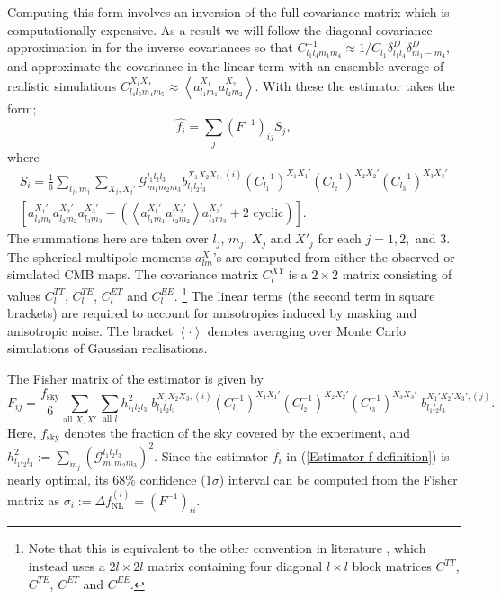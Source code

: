 Computing this form involves an inversion of the full covariance matrix which is computationally expensive. As a result we will follow the diagonal covariance approximation in \cite{Yadav2007} for the inverse covariances so that {$C_{l_1 l_4 m_1 m_4}^{-1} \approx 1/C_{l_1}  \delta^D_{l_1 l_4} \delta^D_{m_1 -m_4}$}, and approximate the covariance in the linear term with an ensemble average of realistic simulations  {$C_{l_4 l_5 m_4 m_5}^{X_1 X_2} \approx \left< a_{l_1 m_1}^{X_1} a_{l_2 m_2}^{X_2} \right>$}.  With these the estimator takes the form;
\begin{equation}
	\hat{f_i} = \sum_j (F^{-1})_{ij} S_j,
	\label{Estimator f definition}
\end{equation}
where
\begin{eqnarray}
	S_i =  \frac{1}{6} \sum_{l_j, m_j} \sum_{X_j, X_j'} \mathcal{G}_{m_1 m_2 m_3}^{l_1 l_2 l_3} b_{l_1 l_2 l_3} ^{X_1 X_2 X_3, (i)} (C_{l_1}^{-1})^{X_1 X_1'} (C_{l_2}^{-1})^{X_2 X_2'} (C_{l_3}^{-1})^{X_3 X_3'} \nonumber \\  \left[ a_{l_1 m_1}^{X_1'} a_{l_2 m_2}^{X_2'} a_{l_3 m_3}^{X_3'} -  \left( \left< a_{l_1 m_1}^{X_1'} a_{l_2 m_2}^{X_2'} \right> a_{l_3 m_3}^{X_3'} + \text{2 cyclic} \right)   \right].
	\label{Estimator S definition}
\end{eqnarray}
The summations here are taken over $l_j$, $m_j$, $X_j$ and $X'_j$ for each $j=1,2,$ and $3$. The spherical multipole moments $a_{lm}^{X}$'s are computed from either the observed or simulated CMB maps. The covariance matrix $C_l^{XY}$ is a $2\times2$ matrix consisting of values $C_l^{TT}$, $C_l^{TE}$, $C_l^{ET}$ and $C_l^{EE}$. \footnote{Note that this is equivalent to the other convention in literature \cite{Fergusson2014}, which instead uses a $2l\times2l$ matrix containing four diagonal $l\times l$ block matrices $C^{TT}$, $C^{TE}$, $C^{ET}$ and $C^{EE}$.} The linear terms (the second term in square brackets) are required to account for anisotropies induced by masking and anisotropic noise. The bracket $\left< \cdot \right>$ denotes averaging over Monte Carlo simulations of Gaussian realisations.

The Fisher matrix of the estimator is given by
\begin{equation}
	F_{ij}= \frac{f_\text{sky}}{6} \sum_{\text{all }X, X'} \sum_{\text{all }l} h_{l_1 l_2 l_3}^2 \; b_{l_1 l_2 l_3}^{X_1 X_2 X_3, (i)} (C_{l_1}^{-1})^{X_1 X_1'} (C_{l_2}^{-1})^{X_2 X_2'} (C_{l_3}^{-1})^{X_3 X_3'} \; b_{l_1 l_2 l_3}^{X_1' X_2' X_3', (j)}.
	\label{Estimator F definition}
\end{equation}
Here, $f_\text{sky}$ denotes the fraction of the sky covered by the experiment, and $h_{l_1 l_2 l_3}^2 := \sum_{m_j} \left( \mathcal{G}_{m_1 m_2 m_3}^{l_1 l_2 l_3} \right) ^2$. Since the estimator $\hat{f}_i$ in (\ref{Estimator f definition}) is nearly optimal, its 68\% confidence (1$\sigma$) interval can be computed from the Fisher matrix as $\sigma_i := \Delta f_\text{NL}^{(i)} = (F^{-1})_{ii}$.

